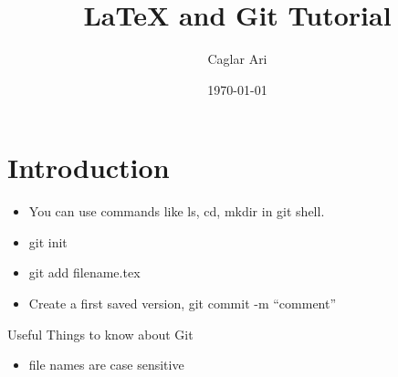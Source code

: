\documentclass[12pt]{article}
\begin{document}
\title{\LaTeX\; and Git Tutorial}
\author{Caglar Ari}
\date{\today}
\maketitle
{}

\section{Introduction}
\begin{itemize}
\item You can use commands like ls, cd, mkdir in git shell.
\item git init
\item git add filename.tex
\item Create a first saved version, git commit -m "`comment"'
\end{itemize}

Useful Things to know about Git
\begin{itemize}
\item file names are case sensitive
\end{itemize}
\end{document}
